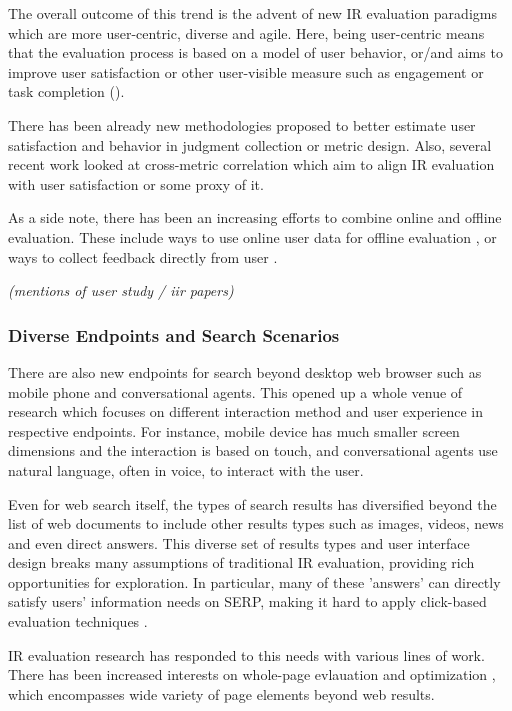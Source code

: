 \documentclass[openany]{now} %
\newcommand{\authornote}[3]{\marginpar{\tiny\color{#1}#2: #3}{\color{#1}{$\star$}}}
\newcommand{\emine}[1]{\authornote{green}{Emine}{#1}}
\newcommand{\note}[1]{\textit{(#1)}}
\begin{document}
The overall outcome of this trend is the advent of new IR evaluation paradigms which are more user-centric, diverse and agile. Here, being user-centric means that the evaluation process is based on a model of user behavior, or/and aims to improve user satisfaction or other user-visible measure such as engagement or task completion (\cite{scholer13}). 

There has been already new methodologies proposed to better estimate user satisfaction and behavior in judgment collection \cite{VermaY16, VermaYC16} or metric design\cite{YilmazSCR10, CarteretteKY11, ChapelleMZG09}. Also, several recent work looked at cross-metric correlation \cite{Al-Maskari2007} \cite{radl:comp10} which aim to align IR evaluation with user satisfaction or some proxy of it.

As a side note, there has been an increasing efforts to combine online and offline evaluation. These include ways to use online user data for offline evaluation \cite{Li:2015} \cite{li2010contextual} \cite{chuklin2015click}, or ways to collect feedback directly from user \cite{Kim2016}. 

\note{mentions of user study / iir papers}

\subsubsection{Diverse Endpoints and Search Scenarios}

There are also new endpoints for search beyond desktop web browser such as mobile phone and conversational agents. This opened up a whole venue of research which focuses on different interaction method and user experience in respective endpoints. For instance, mobile device has much smaller screen dimensions and the interaction is based on touch, and conversational agents use natural language, often in voice, to interact with the user.

Even for web search itself, the types of search results has diversified beyond the list of web documents to include other results types such as images, videos, news and even direct answers. This diverse set of results types and user interface design breaks many assumptions of traditional IR evaluation, providing rich opportunities for exploration. In particular, many of these 'answers' can directly satisfy users' information needs on SERP, making it hard to apply click-based evaluation techniques \cite{Li2009GA} \cite{diriye2012leaving}.

IR evaluation research has responded to this needs with various lines of work. There has been increased\emine{} interests on whole-page evlauation and optimization \cite{Zhou:2012}, which encompasses wide variety of page elements beyond web results. %
\end{document}
